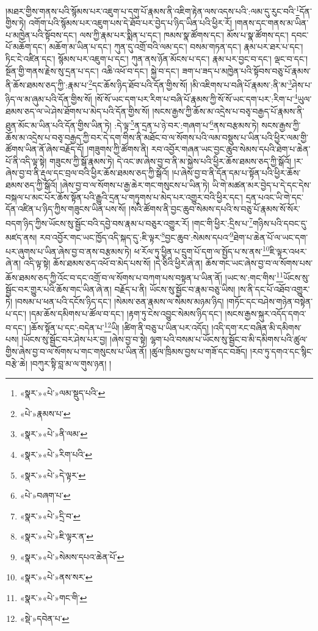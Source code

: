 །མཐར་གྱིས་གནས་པའི་སྙོམས་པར་འཇུག་པ་དགུ་པོ་རྣམས་ནི་འཇིག་རྟེན་ལས་འདས་པའི་:ལམ་དུ་རུང་བའི་\footnote{«སྣར་»«པེ་»ལམ་སྡུད་པའི་}དོན་གྱིས་ཏེ། འགོག་པའི་སྙོམས་པར་འཇུག་པས་དེ་ཐོབ་པར་བྱེད་པ་ཉིད་ཡིན་པའི་ཕྱིར་རོ། །གནས་དང་གནས་མ་ཡིན་པ་མཁྱེན་པའི་སྟོབས་དང་། ལས་ཀྱི་རྣམ་པར་སྨིན་པ་དང་། ཁམས་སྣ་ཚོགས་དང་། མོས་པ་སྣ་ཚོགས་དང་། དབང་པོ་མཆོག་དང་། མཆོག་མ་ཡིན་པ་དང་། ཀུན་དུ་འགྲོ་བའི་ལམ་དང་། བསམ་གཏན་དང་། རྣམ་པར་ཐར་པ་དང་། ཏིང་ངེ་འཛིན་དང་། སྙོམས་པར་འཇུག་པ་དང་། ཀུན་ནས་ཉོན་མོངས་པ་དང་། རྣམ་པར་བྱང་བ་དང་། ལྡང་བ་དང་། སྔོན་གྱི་གནས་རྗེས་སུ་དྲན་པ་དང་། འཆི་འཕོ་བ་དང་། སྐྱེ་བ་དང་། ཟག་པ་ཟད་པ་མཁྱེན་པའི་སྟོབས་བཅུ་པོ་རྣམས་ནི་ཆོས་ཐམས་ཅད་ཀྱི་:རྣམ་པ་\footnote{«པེ་»རྣམས་པ་}དང་ཆོས་ཉིད་ཐོབ་པའི་དོན་གྱིས་སོ། །མི་འཇིགས་པ་བཞི་པོ་རྣམས་:ནི་མ་\footnote{«སྣར་»«པེ་»ནི་ལམ་}ཤེས་པ་ཉིད་ལ་མ་ཞུམ་པའི་དོན་གྱིས་སོ། །སོ་སོ་ཡང་དག་པར་རིག་པ་བཞི་པོ་རྣམས་ཀྱི་སོ་སོ་ཡང་དག་པར་:རིག་པ་\footnote{«སྣར་»«པེ་»རིག་པའི་}ཡུལ་ཐམས་ཅད་ལ་ཡེ་ཤེས་ཐོགས་པ་མེད་པའི་དོན་གྱིས་སོ། །སངས་རྒྱས་ཀྱི་ཆོས་མ་འདྲེས་པ་བཅྭ་བརྒྱད་པོ་རྣམས་ནི་ཐུན་མོང་མ་ཡིན་པའི་དོན་གྱིས་ཡིན་ཏེ། :དེ་ལྟ་\footnote{«སྣར་»«པེ་»དེ་ལྟར་}ན་དྲན་པ་ཉེ་བར་:གཞག་པ་\footnote{«པེ་»བཞག་པ་}ནས་བརྩམས་ཏེ། སངས་རྒྱས་ཀྱི་ཆོས་མ་འདྲེས་པ་བཅྭ་བརྒྱད་ཀྱི་བར་དེ་དག་གིས་ནི་མཐོང་བ་ལ་སོགས་པའི་ལམ་བསྡུས་པ་ཡིན་པའི་ཕྱིར་ལམ་གྱི་ཚོགས་ཡིན་ནོ་ཞེས་བརྗོད་དོ། །གཟུགས་ཀྱི་ཚོགས་ནི། རབ་འབྱོར་གཞན་ཡང་བྱང་ཆུབ་སེམས་དཔའི་ཐེག་པ་ཆེན་པོ་ནི་འདི་ལྟ་སྟེ། གཟུངས་ཀྱི་སྒོ་རྣམས་ཏེ། དེ་འང་ཨ་ཞེས་བྱ་བ་ནི་མ་སྐྱེས་པའི་ཕྱིར་ཆོས་ཐམས་ཅད་ཀྱི་སྒོའོ། །ར་ཞེས་བྱ་བ་ནི་རྡུལ་དང་བྲལ་བའི་ཕྱིར་ཆོས་ཐམས་ཅད་ཀྱི་སྒོའོ། །པ་ཞེས་བྱ་བ་ནི་དོན་དམ་པ་སྟོན་པའི་ཕྱིར་ཆོས་ཐམས་ཅད་ཀྱི་སྒོའོ། །ཞེས་བྱ་བ་ལ་སོགས་པ་རྒྱ་ཆེར་གང་གསུངས་པ་ཡིན་ཏེ། ཡི་གེ་མཚན་མར་བྱེད་པ་དེ་དང་དེས་བསྐལ་པ་མང་པོར་ཆོས་སྟོན་པའི་རྒྱུའི་དྲན་པ་གཏུགས་པ་མེད་པར་འགྱུར་བའི་ཕྱིར་དང་། དྲན་པའང་ཡི་གེ་དང་དོན་འཛིན་པ་ཉིད་ཀྱིས་གཟུངས་ཡིན་པས་སོ། །སའི་ཚོགས་ནི་བྱང་ཆུབ་སེམས་དཔའི་ས་བཅུ་པོ་རྣམས་སོ་སོར་བདག་ཉིད་ཀྱིས་ཡོངས་སུ་སྦྱོང་བའི་དབྱེ་བས་རྣམ་པ་བཅུར་འགྱུར་རོ། །གང་གི་ཕྱིར་:དྲིས་པ་\footnote{«སྣར་»«པེ་»དྲི་བ་}གཉིས་པའི་དབང་དུ་མཛད་ནས། རབ་འབྱོར་གང་ཡང་ཁྱོད་འདི་སྐད་དུ་:ཇི་ལྟར་\footnote{«སྣར་»«པེ་»ཇི་ལྟར་ན་}བྱང་ཆུབ་:སེམས་དཔའ་\footnote{«སྣར་»«པེ་»སེམས་དཔའ་ཆེན་པོ་}ཐེག་པ་ཆེན་པོ་ལ་ཡང་དག་པར་ཞུགས་པ་ཡིན་ཞེས་བྱ་བ་ནས་བརྩམས་ཏེ། ཕ་རོལ་ཏུ་ཕྱིན་པ་དྲུག་པོ་དག་ལ་སྤྱོད་པ་ས་ནས་\footnote{«སྣར་»«པེ་»ནས་སར་}ཇི་ལྟར་འཕར་ཞེ་ན། འདི་ལྟ་སྟེ། ཆོས་ཐམས་ཅད་འཕོ་བ་མེད་པས་སོ། །དེ་ཅིའི་ཕྱིར་ཞེ་ན། ཆོས་གང་ཡང་ཞེས་བྱ་བ་ལ་སོགས་པས་ཆོས་ཐམས་ཅད་ཀྱི་འོང་བ་དང་འགྲོ་བ་ལ་སོགས་པ་བཀག་པས་བསྟན་པ་ཡིན་ནོ། །ཡང་ས་:གང་གིས་\footnote{«སྣར་»«པེ་»གང་གི་}ཡོངས་སུ་སྦྱོང་བར་གྱུར་པའི་ཆོས་གང་ཡིན་ཞེ་ན། བརྗོད་པ་ནི། ཡོངས་སུ་སྦྱོང་བ་རྣམ་བཅུ་ཡིས། །ས་ནི་དང་པོ་འཐོབ་འགྱུར་ཏེ། །བསམ་པ་ཕན་པའི་དངོས་ཉིད་དང་། །སེམས་ཅན་རྣམས་ལ་སེམས་མཉམ་ཉིད། །གཏོང་དང་བཤེས་གཉེན་བསྟེན་པ་དང་། །དམ་ཆོས་དམིགས་པ་ཚོལ་བ་དང་། །རྟག་ཏུ་ངེས་འབྱུང་སེམས་ཉིད་དང་། །སངས་རྒྱས་སྐུར་འདོད་དགའ་བ་དང་། །ཆོས་སྟོན་པ་དང་:བདེན་པ་\footnote{«སྡེ་»དབེན་པ་}ཡི། །ཚིག་ནི་བཅུ་པ་ཡིན་པར་འདོད། །འདི་དག་རང་བཞིན་མི་དམིགས་པས། །ཡོངས་སུ་སྦྱོང་བར་ཤེས་པར་བྱ། །ཞེས་བྱ་བ་སྟེ། ལྷག་པའི་བསམ་པ་ཡོངས་སུ་སྦྱོང་བ་མི་དམིགས་པའི་ཚུལ་གྱིས་ཞེས་བྱ་བ་ལ་སོགས་པ་གང་གསུངས་པ་ཡིན་ནོ། །ཚུལ་ཁྲིམས་བྱས་པ་གཟོ་དང་བཟོད། །རབ་ཏུ་དགའ་དང་སྙིང་བརྩེ་ཆེ། །བཀུར་སྟི་བླ་མ་ལ་གུས་ཉན། །

